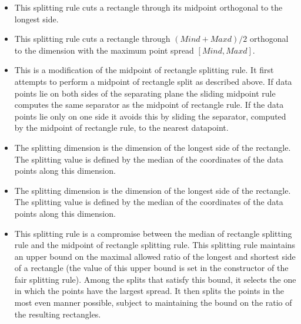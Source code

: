 \begin{itemize}

\item {}

This splitting rule cuts a rectangle through its midpoint orthogonal
to the longest side.

\item {}

This splitting rule cuts a rectangle through $(Mind+Maxd)/2$ orthogonal
to the dimension with the maximum point spread $[Mind,Maxd]$.

\item {}

This is a modification of the midpoint of rectangle splitting rule.
It first attempts to perform a midpoint of rectangle split as
described above. If data points lie on both sides of the separating
plane the sliding midpoint rule computes the same separator as
the midpoint of rectangle rule. If the data points lie only on one
side it avoids this by sliding the separator, computed by
the midpoint of rectangle rule, to the nearest datapoint.

\item {}

The splitting dimension is the dimension of the longest side of the rectangle.
The splitting value is defined by the median of the coordinates of the data points
along this dimension.

\item {}

The splitting dimension is the dimension of the longest side of the rectangle.
The splitting value is defined by the median of the coordinates of the data points
along this dimension.

\item {}

This splitting rule is a compromise between the median of rectangle
splitting rule and the midpoint of rectangle splitting rule. This
splitting rule maintains an upper bound on the maximal allowed ratio
of the longest and shortest side of a rectangle (the value of this
upper bound is set in the constructor of the fair splitting
rule). Among the splits that satisfy this bound, it selects the one in
which the points have the largest spread.  It then splits the points
in the most even manner possible, subject to maintaining the bound on
the ratio of the resulting rectangles.


\end{itemize}
